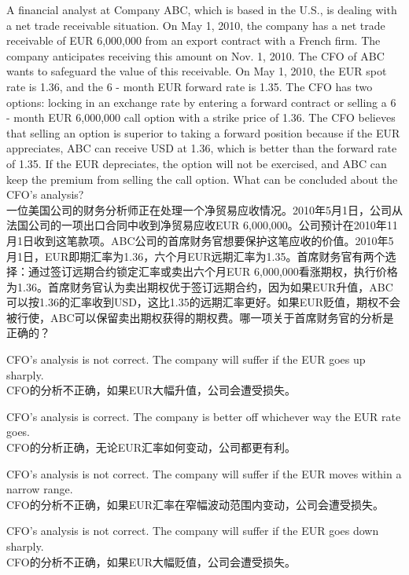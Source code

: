 \documentclass{article}
\newcounter{question} %
\begin{document}
    \begin{question}
        A financial analyst at Company ABC, which is based in the U.S., is dealing with a net trade receivable situation. On May 1, 2010, the company has a net trade receivable of EUR 6,000,000 from an export contract with a French firm. The company anticipates receiving this amount on Nov. 1, 2010. The CFO of ABC wants to safeguard the value of this receivable. On May 1, 2010, the EUR spot rate is 1.36, and the 6 - month EUR forward rate is 1.35. The CFO has two options: locking in an exchange rate by entering a forward contract or selling a 6 - month EUR 6,000,000 call option with a strike price of 1.36. The CFO believes that selling an option is superior to taking a forward position because if the EUR appreciates, ABC can receive USD at 1.36, which is better than the forward rate of 1.35. If the EUR depreciates, the option will not be exercised, and ABC can keep the premium from selling the call option. What can be concluded about the CFO's analysis?\\
        一位美国公司的财务分析师正在处理一个净贸易应收情况。2010年5月1日，公司从法国公司的一项出口合同中收到净贸易应收EUR 6,000,000。公司预计在2010年11月1日收到这笔款项。ABC公司的首席财务官想要保护这笔应收的价值。2010年5月1日，EUR即期汇率为1.36，六个月EUR远期汇率为1.35。首席财务官有两个选择：通过签订远期合约锁定汇率或卖出六个月EUR 6,000,000看涨期权，执行价格为1.36。首席财务官认为卖出期权优于签订远期合约，因为如果EUR升值，ABC可以按1.36的汇率收到USD，这比1.35的远期汇率更好。如果EUR贬值，期权不会被行使，ABC可以保留卖出期权获得的期权费。哪一项关于首席财务官的分析是正确的？
        \end{question}
        
        \begin{choices}
            \item CFO's analysis is not correct. The company will suffer if the EUR goes up sharply.\\
            CFO的分析不正确，如果EUR大幅升值，公司会遭受损失。
            \item CFO's analysis is correct. The company is better off whichever way the EUR rate goes.\\
            CFO的分析正确，无论EUR汇率如何变动，公司都更有利。
            \item CFO's analysis is not correct. The company will suffer if the EUR moves within a narrow range.\\
            CFO的分析不正确，如果EUR汇率在窄幅波动范围内变动，公司会遭受损失。
            \item CFO's analysis is not correct. The company will suffer if the EUR goes down sharply.\\
            CFO的分析不正确，如果EUR大幅贬值，公司会遭受损失。
        \end{choices}
        
\end{document}
